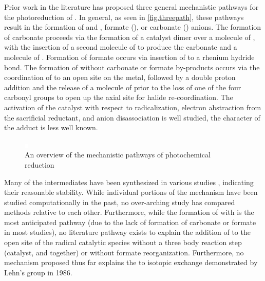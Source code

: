 Prior work in the literature has proposed three general mechanistic pathways for the photoreduction of . In general, as seen in \autoref{fig.threepath}, these pathways result in the formation of  and , formate (), or carbonate () anions. The formation of carbonate proceeds via the formation of a catalyst dimer over a molecule of , with the insertion of a second molecule of  to produce the carbonate and a molecule of . Formation of formate occurs via insertion of  to a rhenium hydride bond. The formation of  without carbonate or formate by-products occurs via the coordination of  to an open site on the metal, followed by a double proton addition and the release of a molecule of  prior to the loss of one of the four carbonyl groups to open up the axial site for halide re-coordination. The activation of the catalyst with respect to radicalization, electron abstraction from the sacrificial reductant, and anion disassociation is well studied, the character of the  adduct is less well known.

\begin{figure}[!htbp]
 \begin{center}
  \includegraphics[clip=true]{images/insertgraphic.eps}
 \end{center}
\caption[Overview of mechanistic pathways]{An overview of the mechanistic pathways of photochemical  reduction}
\label{fig.threepath}
\end{figure} 

Many of the intermediates have been synthesized in various studies , indicating their reasonable stability. While individual portions of the mechanism have been studied computationally in the past, no over-arching study has compared methods relative to each other. Furthermore, while the formation of  with  is the most anticipated pathway (due to the lack of formation of carbonate or formate in most studies), no literature pathway exists to explain the addition of  to the open site of the radical catalytic species without a three body reaction step (catalyst,  and  together) or without formate reorganization. Furthermore, no mechanism proposed thus far explains the  to  isotopic exchange demonstrated by Lehn's group in 1986\autocite{hawecker1986}. 

